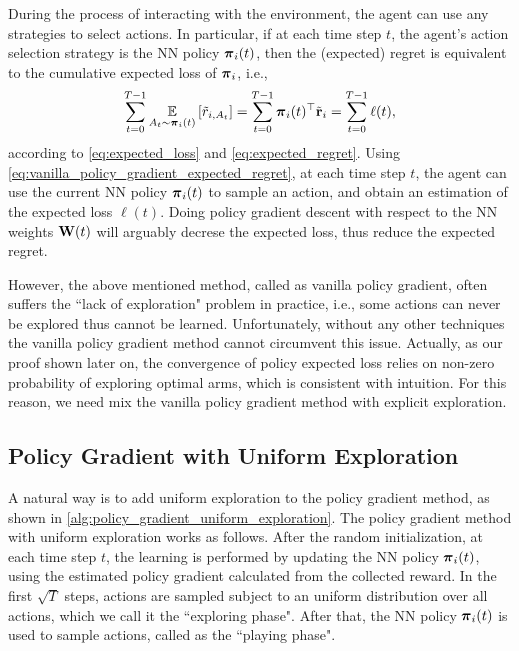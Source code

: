 During the process of interacting with the environment, the agent can use any strategies to select actions. In particular, if at each time step $t$, the agent's action selection strategy is the NN policy ${\boldsymbol{\pi}}_i(t)$, then the (expected) regret is equivalent to the cumulative expected loss of ${\boldsymbol{\pi}}_i$, i.e., 
\begin{equation}
\label{eq:vanilla_policy_gradient_expected_regret}
\begin{split}
    \sum\limits_{t=0}^{T-1}{ \operatorname*{{\mathbb{E}}}\limits_{A_t \sim {\boldsymbol{\pi}}_i(t)} \left[ \tilde{r}_{i, A_t} \right] } = \sum\limits_{t=0}^{T-1}{{\boldsymbol{\pi}}_i(t)^\top {\tilde{\mathbf{r}}}_i} = \sum\limits_{t=0}^{T-1}{\ell(t)},
\end{split}
\end{equation}
according to \cref{eq:expected_loss} and \cref{eq:expected_regret}. Using \cref{eq:vanilla_policy_gradient_expected_regret}, at each time step $t$, the agent can use the current NN policy ${\boldsymbol{\pi}}_i(t)$ to sample an action, and obtain an estimation of the expected loss $\ell(t)$. Doing policy gradient descent with respect to the NN weights ${\mathbf{W}}(t)$ will arguably decrese the expected loss, thus reduce the expected regret. 

However, the above mentioned method, called as vanilla policy gradient, often suffers the ``lack of exploration" problem in practice, i.e., some actions can never be explored thus cannot be learned. Unfortunately, without any other techniques the vanilla policy gradient method cannot circumvent this issue. Actually, as our proof shown later on, the convergence of policy expected loss relies on non-zero probability of exploring optimal arms, which is consistent with intuition. For this reason, we need mix the vanilla policy gradient method with explicit exploration.

\subsection{Policy Gradient with Uniform Exploration}

A natural way is to add uniform exploration to the policy gradient method, as shown in \cref{alg:policy_gradient_uniform_exploration}. The policy gradient method with uniform exploration works as follows. After the random initialization, at each time step $t$, the learning is performed by updating the NN policy ${\boldsymbol{\pi}}_i(t)$, using the estimated policy gradient calculated from the collected reward. In the first $\sqrt{T}$ steps, actions are sampled subject to an uniform distribution over all actions, which we call it the ``exploring phase". After that, the NN policy ${\boldsymbol{\pi}}_i(t)$ is used to sample actions, called as the ``playing phase".

